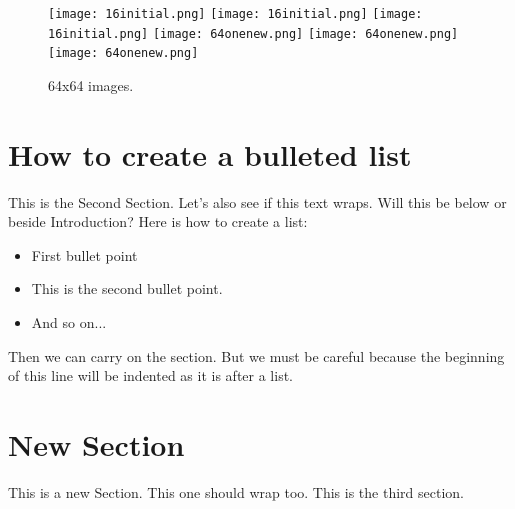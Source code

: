 \documentclass{article}
\begin{document}
\begin{figure}[H]
\centering
\texttt{[image: 16initial.png]}
\texttt{[image: 16initial.png]}
\texttt{[image: 16initial.png]}
\texttt{[image: 64onenew.png]}
\texttt{[image: 64onenew.png]}
\texttt{[image: 64onenew.png]}
\caption{64x64 images.}
\end{figure}



\section{How to create a bulleted list}
This is the Second Section. Let's also see if this text wraps. Will this be below or beside Introduction? Here is how to create a list:

\begin{itemize}
\item First bullet point
\item This is the second bullet point.
\item And so on...
\end{itemize}

Then we can carry on the section. But we must be careful because the beginning of this line will be indented as it is after a list.


\section{New Section}
This is a new Section. This one should wrap too. This is the third section.


\end{document}
